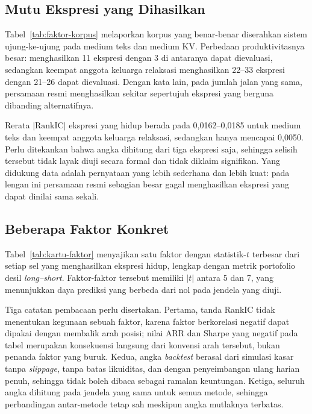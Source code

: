 \subsection{Mutu Ekspresi yang Dihasilkan}



Tabel~\ref{tab:faktor-korpus} melaporkan korpus yang benar-benar diserahkan
sistem ujung-ke-ujung pada medium teks dan medium KV. Perbedaan
produktivitasnya besar:  menghasilkan 11 ekspresi dengan 3 di
antaranya dapat dievaluasi, sedangkan keempat anggota keluarga relaksasi
menghasilkan 22--33 ekspresi dengan 21--26 dapat dievaluasi. Dengan kata lain,
pada jumlah jalan yang sama, persamaan resmi menghasilkan sekitar sepertujuh
ekspresi yang berguna dibanding alternatifnya.

Rerata $|\text{RankIC}|$ ekspresi yang hidup berada pada 0,0162--0,0185 untuk
medium teks dan keempat anggota keluarga relaksasi, sedangkan  hanya
mencapai 0,0050. Perlu ditekankan bahwa angka  dihitung dari tiga
ekspresi saja, sehingga selisih tersebut tidak layak diuji secara formal dan
tidak diklaim signifikan. Yang didukung data adalah pernyataan yang lebih
sederhana dan lebih kuat: pada lengan ini persamaan resmi sebagian besar gagal
menghasilkan ekspresi yang dapat dinilai sama sekali.

\subsection{Beberapa Faktor Konkret}



Tabel~\ref{tab:kartu-faktor} menyajikan satu faktor dengan statistik-$t$
terbesar dari setiap sel yang menghasilkan ekspresi hidup, lengkap dengan
metrik portofolio desil \textit{long--short}. Faktor-faktor tersebut memiliki
$|t|$ antara 5 dan 7, yang menunjukkan daya prediksi yang berbeda dari nol pada
jendela yang diuji.

Tiga catatan pembacaan perlu disertakan. Pertama, tanda RankIC tidak menentukan
kegunaan sebuah faktor, karena faktor berkorelasi negatif dapat dipakai dengan
membalik arah posisi; nilai ARR dan Sharpe yang negatif pada tabel merupakan
konsekuensi langsung dari konvensi arah tersebut, bukan penanda faktor yang
buruk. Kedua, angka \textit{backtest} berasal dari simulasi kasar tanpa
\textit{slippage}, tanpa batas likuiditas, dan dengan penyeimbangan ulang
harian penuh, sehingga tidak boleh dibaca sebagai ramalan keuntungan. Ketiga,
seluruh angka dihitung pada jendela yang sama untuk semua metode, sehingga
perbandingan antar-metode tetap sah meskipun angka mutlaknya terbatas.

